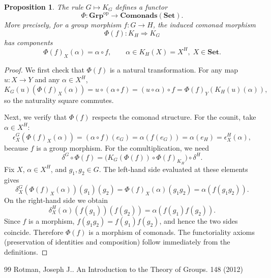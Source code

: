\documentclass[10pt,a4paper]{amsart}
\newtheorem{proposition}{Proposition}
\begin{document}
\begin{proposition}\label{prop:functoriality_comonad}
The rule $G \mapsto K_G$ defines a functor
\[
\Phi \colon \mathbf{Grp}^{\mathrm{op}} \longrightarrow \mathbf{Comonads}(\mathbf{Set}).
\]
More precisely, for a group morphism $f \colon G \longrightarrow H$, the induced comonad morphism
\[
\Phi(f) \colon K_H \Longrightarrow K_G
\]
has components
\[
\Phi(f)_X(\alpha) = \alpha \circ f,
\qquad 
\alpha \in K_H(X) = X^H,\; X \in \mathbf{Set}.
\]
\end{proposition}

\begin{proof}
We first check that $\Phi(f)$ is a natural transformation. For any map $u \colon X \rightarrow Y$ and any $\alpha \in X^H$,
\[
K_G(u)(\Phi(f)_X(\alpha)) = u \circ (\alpha \circ f) = (u \circ \alpha) \circ f = \Phi(f)_Y(K_H(u)(\alpha)),
\]
so the naturality square commutes.

Next, we verify that $\Phi(f)$ respects the comonad structure. 
For the counit, take $\alpha \in X^H$:
\[
\epsilon^G_X(\Phi(f)_X(\alpha)) = (\alpha \circ f)(e_G) = \alpha(f(e_G)) = \alpha(e_H) = \epsilon^H_X(\alpha),
\]
because $f$ is a group morphism. For the comultiplication, we need
\[
\delta^G \circ \Phi(f) = \bigl( K_G(\Phi(f)) \circ \Phi(f)_{K_H} \bigr) \circ \delta^H.
\]
Fix $X$, $\alpha \in X^H$, and $g_1,g_2 \in G$. 
The left-hand side evaluated at these elements gives
\[
\delta^G_X(\Phi(f)_X(\alpha))(g_1)(g_2) = \Phi(f)_X(\alpha)(g_1 g_2) = \alpha(f(g_1 g_2)).
\]
On the right-hand side we obtain
\[
\delta^H_X(\alpha)(f(g_1))(f(g_2)) = \alpha(f(g_1) f(g_2)).
\]
Since $f$ is a morphism, $f(g_1 g_2) = f(g_1)f(g_2)$, and hence the two sides coincide. Therefore $\Phi(f)$ is a morphism of comonads. The functoriality axioms (preservation of identities and composition) follow immediately from the definitions.
\end{proof}


\begin{thebibliography}{99}
 Rotman, Joseph J.. An Introduction to the Theory of Groups. 148 (2012)
\end{thebibliography}
\end{document}
